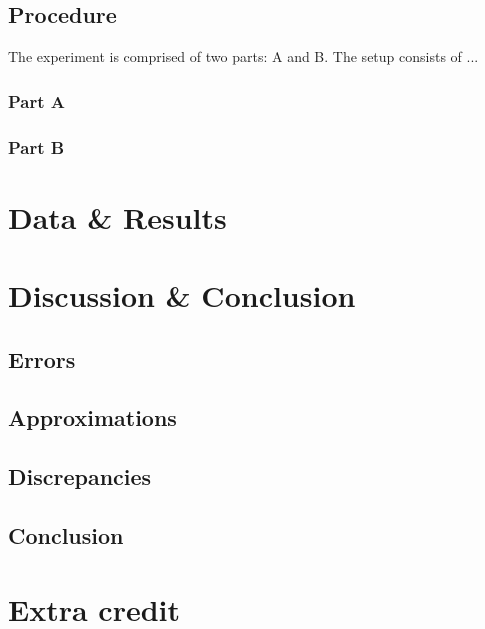 \documentclass[10pt]{article}
\begin{document}
\subsection*{Procedure}

The experiment is comprised of two parts: A and B. The setup consists of ...

\subsubsection*{Part A}

\subsubsection*{Part B}

\section{Data \& Results}

\section{Discussion \& Conclusion}

\subsection*{Errors}

\subsection*{Approximations}

\subsection*{Discrepancies}

\subsection*{Conclusion}

\section{Extra credit}

\end{document}
